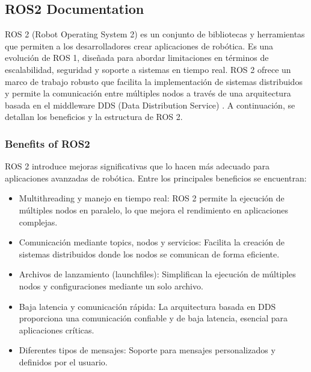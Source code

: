 \subsection{ROS2 Documentation}
    ROS 2 (Robot Operating System 2) es un conjunto de bibliotecas y herramientas que permiten a los desarrolladores crear aplicaciones de robótica. Es una evolución de ROS 1, diseñada para abordar limitaciones en términos de escalabilidad, seguridad y soporte a sistemas en tiempo real. ROS 2 ofrece un marco de trabajo robusto que facilita la implementación de sistemas distribuidos y permite la comunicación entre múltiples nodos a través de una arquitectura basada en el middleware DDS (Data Distribution Service) \cite{ros_docs}. A continuación, se detallan los beneficios y la estructura de ROS 2.

    \subsubsection{Benefits of ROS2}

    ROS 2 introduce mejoras significativas que lo hacen más adecuado para aplicaciones avanzadas de robótica. Entre los principales beneficios se encuentran:

    \begin{itemize} \item Multithreading y manejo en tiempo real: ROS 2 permite la ejecución de múltiples nodos en paralelo, lo que mejora el rendimiento en aplicaciones complejas. \item Comunicación mediante topics, nodos y servicios: Facilita la creación de sistemas distribuidos donde los nodos se comunican de forma eficiente. \item Archivos de lanzamiento (launchfiles): Simplifican la ejecución de múltiples nodos y configuraciones mediante un solo archivo. \item Baja latencia y comunicación rápida: La arquitectura basada en DDS proporciona una comunicación confiable y de baja latencia, esencial para aplicaciones críticas. \item Diferentes tipos de mensajes: Soporte para mensajes personalizados y definidos por el usuario. \end{itemize}


